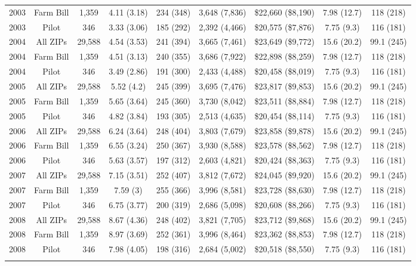 \begin{table}[!htbp]
\begin{tabular}{@{\extracolsep{5pt}} ccccccccc}
2003 & Farm Bill & 1,359 & 4.11 (3.18) & 234 (348) & 3,648 (7,836) & \$22,660 (\$8,190) & 7.98 (12.7) & 118 (218) \\ 
2003 & Pilot & 346 & 3.33 (3.06) & 185 (292) & 2,392 (4,466) & \$20,575 (\$7,876) & 7.75 (9.3) & 116 (181) \\ 
2004 & All ZIPs & 29,588 & 4.54 (3.53) & 241 (394) & 3,665 (7,461) & \$23,649 (\$9,772) & 15.6 (20.2) & 99.1 (245) \\ 
2004 & Farm Bill & 1,359 & 4.51 (3.13) & 240 (355) & 3,686 (7,922) & \$22,898 (\$8,259) & 7.98 (12.7) & 118 (218) \\ 
2004 & Pilot & 346 & 3.49 (2.86) & 191 (300) & 2,433 (4,488) & \$20,458 (\$8,019) & 7.75 (9.3) & 116 (181) \\ 
2005 & All ZIPs & 29,588 & 5.52 (4.2) & 245 (399) & 3,695 (7,476) & \$23,817 (\$9,853) & 15.6 (20.2) & 99.1 (245) \\ 
2005 & Farm Bill & 1,359 & 5.65 (3.64) & 245 (360) & 3,730 (8,042) & \$23,511 (\$8,884) & 7.98 (12.7) & 118 (218) \\ 
2005 & Pilot & 346 & 4.82 (3.84) & 193 (305) & 2,513 (4,635) & \$20,454 (\$8,114) & 7.75 (9.3) & 116 (181) \\ 
2006 & All ZIPs & 29,588 & 6.24 (3.64) & 248 (404) & 3,803 (7,679) & \$23,858 (\$9,878) & 15.6 (20.2) & 99.1 (245) \\ 
2006 & Farm Bill & 1,359 & 6.55 (3.24) & 250 (367) & 3,930 (8,588) & \$23,578 (\$8,562) & 7.98 (12.7) & 118 (218) \\ 
2006 & Pilot & 346 & 5.63 (3.57) & 197 (312) & 2,603 (4,821) & \$20,424 (\$8,363) & 7.75 (9.3) & 116 (181) \\ 
2007 & All ZIPs & 29,588 & 7.15 (3.51) & 252 (407) & 3,812 (7,672) & \$24,045 (\$9,920) & 15.6 (20.2) & 99.1 (245) \\ 
2007 & Farm Bill & 1,359 & 7.59 (3) & 255 (366) & 3,996 (8,581) & \$23,728 (\$8,630) & 7.98 (12.7) & 118 (218) \\ 
2007 & Pilot & 346 & 6.75 (3.77) & 200 (319) & 2,686 (5,098) & \$20,608 (\$8,266) & 7.75 (9.3) & 116 (181) \\ 
2008 & All ZIPs & 29,588 & 8.67 (4.36) & 248 (402) & 3,821 (7,705) & \$23,712 (\$9,868) & 15.6 (20.2) & 99.1 (245) \\ 
2008 & Farm Bill & 1,359 & 8.97 (3.69) & 252 (361) & 3,996 (8,464) & \$23,362 (\$8,853) & 7.98 (12.7) & 118 (218) \\ 
2008 & Pilot & 346 & 7.98 (4.05) & 198 (316) & 2,684 (5,002) & \$20,518 (\$8,550) & 7.75 (9.3) & 116 (181) \\ 
\hline \\[-1.8ex] 
\end{tabular} 
\end{table} 
